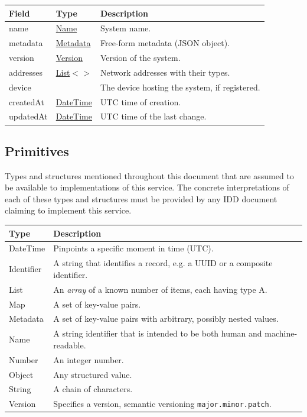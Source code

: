 \documentclass[a4paper]{arrowhead}
\newcommand{\mref}[2][]{{\textcolor{ArrowheadPurple}{\hyperref[sec:model:#2]{\ifstrempty{#1}{#2}{#1}}}}}
\newcommand{\pdef}[1]{{\textcolor{ArrowheadGrey}{#1\label{sec:model:primitives:#1}\label{sec:model:primitives:#1s}\label{sec:model:primitives:#1es}}}}
\newcommand{\pref}[1]{{\textcolor{ArrowheadGrey}{\hyperref[sec:model:primitives:#1]{#1}}}}
\begin{document}
\noindent\begin{tabularx}{\textwidth}{| >{\raggedright\arraybackslash}p{3.9cm} | >{\raggedright\arraybackslash\small}p{5.3cm} | X |} \hline
\rowcolor{gray!33} Field & Type & Description \\ \hline
name & \pref{Name} & System name. \\ \hline
metadata & \pref{Metadata} & Free-form metadata (JSON object). \\ \hline
version & \pref{Version} & Version of the system. \\ \hline
addresses & \pref{List}$<$\allowbreak{}\mref{Address}$>$ & Network addresses with their types. \\ \hline
device & \mref{DeviceResponse} & The device hosting the system, if registered. \\ \hline
created\allowbreak{}At & \pref{DateTime} & UTC time of creation. \\ \hline
updated\allowbreak{}At & \pref{DateTime} & UTC time of the last change. \\ \hline
\end{tabularx}



\subsection{Primitives}
\label{sec:model:primitives}

Types and structures mentioned throughout this document that are assumed to be available to implementations of this service.
The concrete interpretations of each of these types and structures must be provided by any IDD document claiming to implement this service.

\noindent\begin{tabularx}{\textwidth}{| p{4.6cm} | X |} \hline
\rowcolor{gray!33} Type & Description \\ \hline
\pdef{DateTime} & Pinpoints a specific moment in time (UTC). \\ \hline
\pdef{Identifier} & A string that identifies a record, e.g. a UUID or a composite identifier. \\ \hline
\pdef{List} & An \textit{array} of a known number of items, each having type A. \\ \hline
\pdef{Map} & A set of key-value pairs. \\ \hline
\pdef{Metadata} & A set of key-value pairs with arbitrary, possibly nested values. \\ \hline
\pdef{Name} & A string identifier that is intended to be both human and machine-readable. \\ \hline
\pdef{Number} & An integer number. \\ \hline
\pdef{Object} & Any structured value. \\ \hline
\pdef{String} & A chain of characters. \\ \hline
\pdef{Version} & Specifies a version, semantic versioning \texttt{major.minor.patch}. \\ \hline
\end{tabularx}
\end{document}
